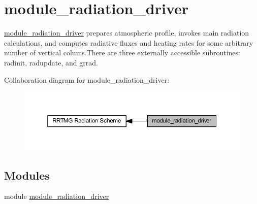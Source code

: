 \hypertarget{group__module__radiation__driver}{}\section{module\+\_\+radiation\+\_\+driver}
\label{group__module__radiation__driver}


\hyperlink{namespacemodule__radiation__driver}{module\+\_\+radiation\+\_\+driver} prepares atmospheric profile, invokes main radiation calculations, and computes radiative fluxes and heating rates for some arbitrary number of vertical colums.\+There are three externally accessible subroutines\+: radinit, radupdate, and grrad.  


Collaboration diagram for module\+\_\+radiation\+\_\+driver\+:\nopagebreak
\begin{figure}[H]
\begin{center}
\leavevmode
\includegraphics[width=350pt]{group__module__radiation__driver}
\end{center}
\end{figure}
\subsection*{Modules}
\begin{DoxyCompactItemize}
\item 
module \hyperlink{namespacemodule__radiation__driver}{module\+\_\+radiation\+\_\+driver}
\end{DoxyCompactItemize}
